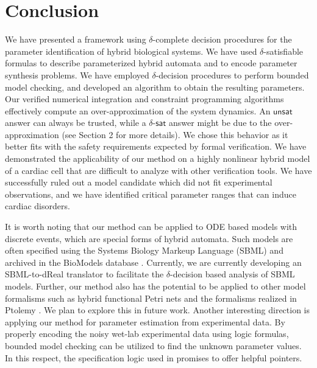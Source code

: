 \section{Conclusion}

We have presented a framework using $\delta$-complete decision procedures for the parameter identification 
of hybrid biological systems. We have used $\delta$-satisfiable formulas to describe parameterized hybrid automata 
and to encode parameter synthesis problems. We have employed $\delta$-decision procedures to perform bounded model 
checking, and developed an algorithm to obtain the resulting parameters. 
Our verified numerical integration and constraint programming algorithms effectively compute an over-approximation of the system dynamics. An  $\mathsf{unsat}$ answer can always be trusted, while a $\delta$-$\mathsf{sat}$ answer might be due to the over-approximation (see Section 2 for more details). We chose this behavior as it better fits with the safety requirements expected by formal verification.
We have demonstrated the applicability of our method on a highly nonlinear hybrid model of a cardiac cell that are
difficult to analyze with other verification tools. We have successfully ruled out a model candidate which did not fit experimental observations, and we have identified critical parameter ranges that can induce cardiac disorders.

It is worth noting that our method can be applied to ODE based models with discrete events, which are special forms of hybrid automata. Such models are often specified using the Systems Biology Markeup Language (SBML) %
and archived in the BioModels database \cite{biomodels}. Currently, we are currently developing an SBML-to-dReal translator to facilitate the $\delta$-decision based analysis of SBML models. 
Further, our method also has the potential to be applied to other model formalisms such as hybrid functional Petri nets \cite{hfpn} and the formalisms realized in Ptolemy \cite{ptolemy}. We plan to explore this in future work.
Another interesting direction is applying our method for parameter estimation from experimental data. By properly encoding the noisy wet-lab experimental data using logic formulas, bounded model checking can be utilized to find the unknown parameter values.
In this respect, the specification logic used in \cite{liu13} promises to offer helpful pointers.




